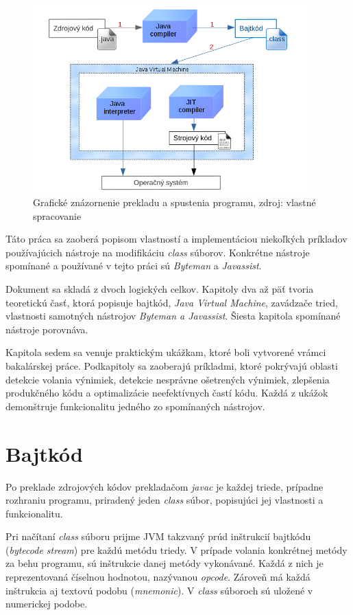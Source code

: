 \documentclass[11pt,final,oneside]{fithesis}
\begin{document}
\begin{figure}[h]
  \centering
   \includegraphics[width=0.96\textwidth]{JVM.png}
  \caption{Grafické znázornenie prekladu a spustenia programu, zdroj: vlastné
  spracovanie}
  \label{fig:jvm}
\end{figure}

Táto práca sa zaoberá popisom vlastností a implementáciou niekoľkých príkladov 
používajúcich nástroje na modifikáciu \textit{class} súborov. 
Konkrétne nástroje spomínané a používané v tejto práci sú \textit{Byteman} a
\textit{Javassist}.

Dokument sa skladá z dvoch logických celkov. Kapitoly dva až päť tvoria
teoretickú časť, ktorá popisuje bajtkód, \textit{Java Virtual Machine},
zavádzače tried, vlastnosti samotných nástrojov \textit{Byteman a Javassist}. 
Šiesta kapitola spomínané nástroje porovnáva.

Kapitola sedem sa venuje praktickým ukážkam, ktoré boli vytvorené vrámci
bakalárskej práce. Podkapitoly sa zaoberajú príkladmi, ktoré pokrývajú
oblasti detekcie volania výnimiek, detekcie nesprávne ošetrených výnimiek,
zlepšenia produkčného kódu a optimalizácie neefektívnych častí kódu. Každá z
ukážok demonštruje funkcionalitu jedného zo spomínaných nástrojov.

\chapter{Bajtkód}
\label{chap:bytecode}

Po preklade zdrojových kódov prekladačom \textit{javac} je každej
triede, prípadne rozhraniu programu, priradený jeden \textit{class} súbor,
popisujúci jej vlastnosti a funkcionalitu.

Pri načítaní \textit{class} súboru prijme JVM takzvaný prúd inštrukcií
bajtkódu (\textit{bytecode stream}) pre každú metódu triedy. V prípade volania
konkrétnej metódy za behu programu, sú inštrukcie danej metódy vykonávané.
Každá z nich je reprezentovaná číselnou hodnotou, nazývanou
\textit{opcode}. Zároveň má každá inštrukcia aj textovú podobu (\textit
{mnemonic}). V \textit{class} súboroch sú uložené v numerickej 
podobe.
\end{document}
